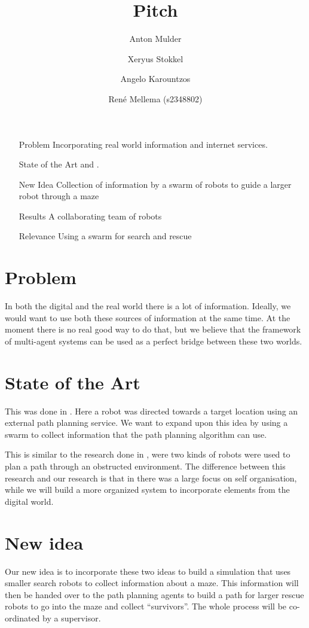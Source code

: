 \documentclass[a4paper,10pt]{article}
\title{Pitch}
\author{Anton Mulder \and Xeryus Stokkel \and Angelo Karountzos \and Ren\'e
    Mellema (s2348802)}
\date{}
\begin{document}
\maketitle

\begin{itemize}
    \item[Problem] Incorporating real world information and internet
        services.
    \item[State of the Art] \citet{intframe} and \citet{selforg}.
    \item[New Idea] Collection of information by a swarm of robots to guide
        a larger robot through a maze
    \item[Results] A collaborating team of robots
    \item[Relevance] Using a swarm for search and rescue
\end{itemize}

\section*{Problem}
In both the digital and the real world there is a lot of information.
Ideally, we would want to use both these sources of information at the same
time. At the moment there is no real good way to do that, but we believe
that the framework of multi-agent systems can be used as a perfect bridge
between these two worlds. 

\section*{State of the Art}
This was done in \citet{intframe}. Here a robot was directed towards
a target location using an external path planning service. We want to
expand upon this idea by using a swarm to collect information that the path
planning algorithm can use.

This is similar to the research done in \citet{selforg}, were two kinds of
robots were used to plan a path through an obstructed environment. The
difference between this research and our research is that in
\citet{selforg} there was a large focus on self organisation, while we will
build a more organized system to incorporate elements from the digital
world. 

\section*{New idea}
Our new idea is to incorporate these two ideas to build a simulation that uses
smaller search robots to collect information about a maze. This information will
then be handed over to the path planning agents to build a path for larger
rescue robots to go into the maze and collect ``survivors''. The whole
process will be co-ordinated by a supervisor. 
\end{document}
